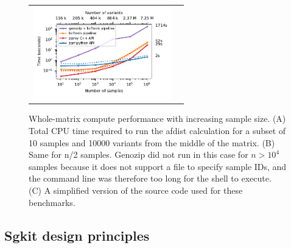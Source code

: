 \documentclass[a4paper,num-refs]{oup-contemporary}
\begin{document}
\begin{figure}
\begin{tabular}{cc}
\includegraphics[width=6cm]{figures/subset-matrix-compute} &






\end{tabular}
\caption{Whole-matrix compute performance with increasing sample size.
(A) Total CPU time required to run the afdist calculation for
a subset of 10 samples and 10000 variants from the middle of the matrix.
(B) Same for n/2 samples. Genozip did not run in this case for
$n > 10^4$ samples because it does not support a file to specify
sample IDs, and the command line was therefore too long for the shell
to execute.
(C) A simplified version of the source code used for these benchmarks.
\label{fig-subset-matrix-compute}}
\end{figure}


\subsection{Sgkit design principles}
\end{document}
